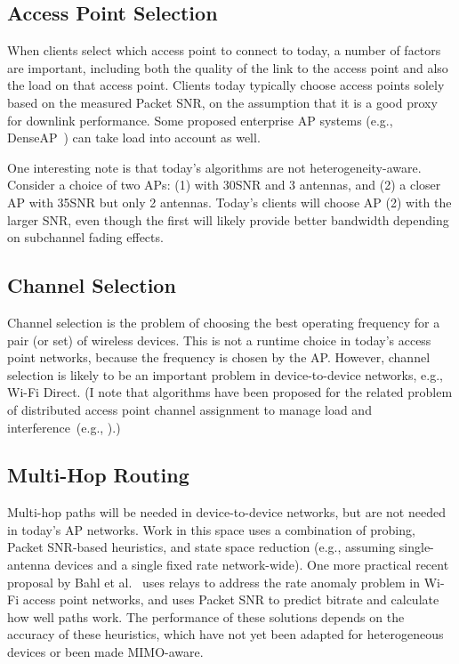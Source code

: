 \subsection{Access Point Selection}
When clients select which access point to connect to today, a number of factors are important, including both the quality of the link to the access point and also the load on that access point. Clients today typically choose access points solely based on the measured Packet SNR, on the assumption that it is a good proxy for downlink performance. Some proposed enterprise AP systems (e.g., DenseAP~\cite{Murty_DenseAP}) can take load into account as well.

One interesting note is that today's algorithms are not heterogeneity-aware. Consider a choice of two APs: (1) with 30\dB SNR and 3 antennas, and (2) a closer AP with 35\dB SNR but only 2 antennas. Today's clients will choose AP (2) with the larger SNR, even though the first will likely provide better bandwidth depending on subchannel fading effects.

\subsection{Channel Selection}
Channel selection is the problem of choosing the best operating frequency for a pair (or set) of wireless devices. This is not a runtime choice in today's access point networks, because the frequency is chosen by the AP. However, channel selection is likely to be an important problem in device-to-device networks, e.g., Wi-Fi Direct. (I note that algorithms have been proposed for the related problem of distributed access point channel assignment to manage load and interference~(e.g., \cite{Akella_Chan}).)

\subsection{Multi-Hop Routing}
Multi-hop paths will be needed in device-to-device networks, but are not needed in today's AP networks. Work in this space uses a combination of probing, Packet SNR-based heuristics, and state space reduction (e.g., assuming single-antenna devices and a single fixed rate network-wide). One more practical recent proposal by Bahl et al.~\cite{Bahl_repeater} uses relays to address the rate anomaly problem in Wi-Fi access point networks, and uses Packet SNR to predict bitrate and calculate how well paths work. The performance of these solutions depends on the accuracy of these heuristics, which have not yet been adapted for heterogeneous devices or been made MIMO-aware.

